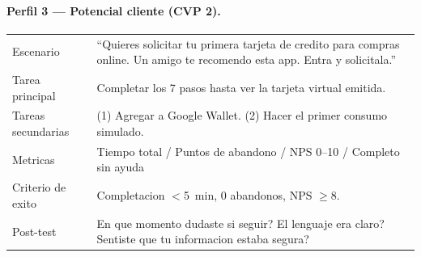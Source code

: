 \documentclass[12pt,a4paper]{article}
\begin{document}
\paragraph{Perfil 3 --- Potencial cliente (CVP 2).}

\begin{center}
\begin{tabularx}{\linewidth}{L{3.5cm}X}
\toprule
{}
 \\
\midrule
Escenario & ``Quieres solicitar tu primera tarjeta de credito para compras online.
Un amigo te recomendo esta app. Entra y solicitala.'' \\
Tarea principal & Completar los 7 pasos hasta ver la tarjeta virtual emitida. \\
Tareas secundarias & (1) Agregar a Google Wallet. (2) Hacer el primer consumo simulado. \\
Metricas & Tiempo total / Puntos de abandono / NPS 0--10 / Completo sin ayuda \\
Criterio de exito & Completacion $<$5~min, 0 abandonos, NPS $\geq$8. \\
Post-test & En que momento dudaste si seguir? El lenguaje era claro? Sentiste
que tu informacion estaba segura? \\
\bottomrule
\end{tabularx}
\end{center}
\end{document}
